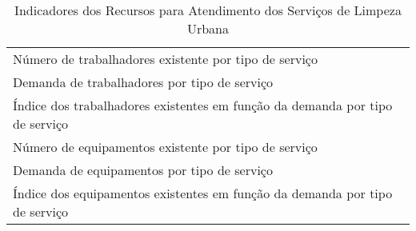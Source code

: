 \begin{table}[h!]
  \centering
  \caption{Indicadores dos Recursos para Atendimento dos Serviços de Limpeza Urbana}
    \begin{tabular}{|p{25em}|}
    \rowcolor[rgb]{ .776,  .878,  .706}
    \multicolumn{1}{P{25em}}{INDICADORES DOS RECURSOS PARA ATENDIMENTO DOS SERVIÇOS DE LIMPEZA URBANA} \\
    \midrule
    Número de trabalhadores existente por tipo de serviço \\
    \midrule
    Demanda de trabalhadores por tipo de serviço \\
    \midrule
    Índice dos trabalhadores existentes em função da demanda por tipo de serviço \\
    \midrule
    Número de equipamentos existente por tipo de serviço \\
    \midrule
    Demanda de equipamentos por tipo de serviço \\
    \midrule
    Índice dos equipamentos existentes em função da demanda por tipo de serviço \\
    \bottomrule
    \end{tabular}%
  \label{tab:ind_recursos_slu}%
\end{table}%
